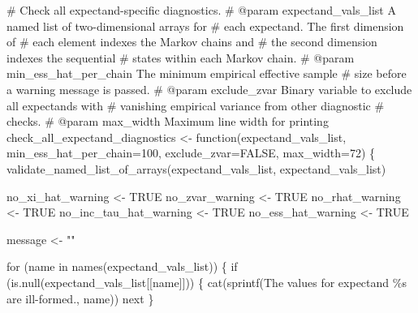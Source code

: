\documentclass[
  letterpaper,
  DIV=11,
  numbers=noendperiod]{scrartcl}
\newenvironment{Shaded}{\begin{snugshade}}{\end{snugshade}}
\newcommand{\BuiltInTok}[1]{\textcolor[rgb]{0.00,0.23,0.31}{#1}}
\newcommand{\CommentTok}[1]{\textcolor[rgb]{0.37,0.37,0.37}{#1}}
\newcommand{\ControlFlowTok}[1]{\textcolor[rgb]{0.00,0.23,0.31}{#1}}
\newcommand{\DecValTok}[1]{\textcolor[rgb]{0.68,0.00,0.00}{#1}}
\newcommand{\KeywordTok}[1]{\textcolor[rgb]{0.00,0.23,0.31}{#1}}
\newcommand{\NormalTok}[1]{\textcolor[rgb]{0.00,0.23,0.31}{#1}}
\newcommand{\OperatorTok}[1]{\textcolor[rgb]{0.37,0.37,0.37}{#1}}
\newcommand{\SpecialCharTok}[1]{\textcolor[rgb]{0.37,0.37,0.37}{#1}}
\newcommand{\StringTok}[1]{\textcolor[rgb]{0.13,0.47,0.30}{#1}}
\begin{document}
\begin{Shaded}
\begin{Highlighting}[]
\CommentTok{\# Check all expectand{-}specific diagnostics.}
\CommentTok{\# @param expectand\_vals\_list A named list of two{-}dimensional arrays for}
\CommentTok{\#                            each expectand.  The first dimension of}
\CommentTok{\#                            each element indexes the Markov chains and}
\CommentTok{\#                            the second dimension indexes the sequential}
\CommentTok{\#                            states within each Markov chain.}
\CommentTok{\# @param min\_ess\_hat\_per\_chain The minimum empirical effective sample}
\CommentTok{\#                              size before a warning message is passed.}
\CommentTok{\# @param exclude\_zvar Binary variable to exclude all expectands with}
\CommentTok{\#                     vanishing empirical variance from other diagnostic}
\CommentTok{\#                     checks.}
\CommentTok{\# @param max\_width Maximum line width for printing}
\NormalTok{check\_all\_expectand\_diagnostics }\OperatorTok{\textless{}{-}}\NormalTok{ function(expectand\_vals\_list,}
\NormalTok{                                            min\_ess\_hat\_per\_chain}\OperatorTok{=}\DecValTok{100}\NormalTok{,}
\NormalTok{                                            exclude\_zvar}\OperatorTok{=}\NormalTok{FALSE,}
\NormalTok{                                            max\_width}\OperatorTok{=}\DecValTok{72}\NormalTok{) \{}
\NormalTok{  validate\_named\_list\_of\_arrays(expectand\_vals\_list,}
                                \StringTok{\textquotesingle{}expectand\_vals\_list\textquotesingle{}}\NormalTok{)}
  
\NormalTok{  no\_xi\_hat\_warning }\OperatorTok{\textless{}{-}}\NormalTok{ TRUE}
\NormalTok{  no\_zvar\_warning }\OperatorTok{\textless{}{-}}\NormalTok{ TRUE}
\NormalTok{  no\_rhat\_warning }\OperatorTok{\textless{}{-}}\NormalTok{ TRUE}
\NormalTok{  no\_inc\_tau\_hat\_warning }\OperatorTok{\textless{}{-}}\NormalTok{ TRUE}
\NormalTok{  no\_ess\_hat\_warning }\OperatorTok{\textless{}{-}}\NormalTok{ TRUE}

\NormalTok{  message }\OperatorTok{\textless{}{-}} \StringTok{""}

  \ControlFlowTok{for}\NormalTok{ (name }\KeywordTok{in}\NormalTok{ names(expectand\_vals\_list)) \{}
    \ControlFlowTok{if}\NormalTok{ (}\KeywordTok{is}\NormalTok{.null(expectand\_vals\_list[[name]])) \{}
\NormalTok{      cat(sprintf(}\StringTok{\textquotesingle{}The values for expectand \textasciigrave{}}\SpecialCharTok{\%s}\StringTok{\textasciigrave{} are ill{-}formed.\textquotesingle{}}\NormalTok{,}
\NormalTok{          name))}
      \BuiltInTok{next}
\NormalTok{    \}}


\end{Highlighting}
\end{Shaded}
\end{document}
